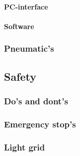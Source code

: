 \documentclass{article}
\begin{document}
        \paragraph{PC-interface}
        \paragraph{Software}
        \subsubsection{Pneumatic's}
    
    \subsection{Safety}
        \subsubsection{Do's and dont's }
        \subsubsection{Emergency stop's}
        \subsubsection{Light grid}
\end{document}
